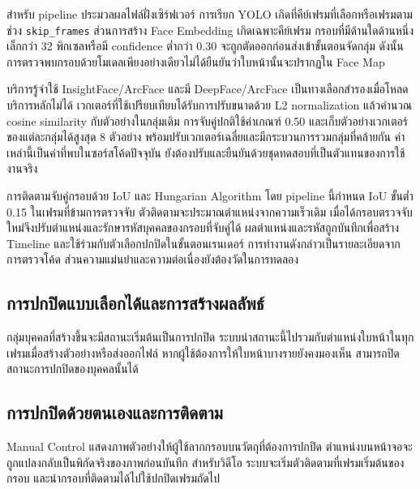 สำหรับ pipeline ประมวลผลไฟล์ฝั่งเซิร์ฟเวอร์ การเรียก YOLO เกิดที่คีย์เฟรมที่เลือกหรือเฟรมตามช่วง \texttt{skip\_frames} ส่วนการสร้าง Face Embedding เกิดเฉพาะคีย์เฟรม กรอบที่มีด้านใดด้านหนึ่งเล็กกว่า 32 พิกเซลหรือมี confidence ต่ำกว่า 0.30 จะถูกตัดออกก่อนส่งเข้าขั้นตอนจัดกลุ่ม ดังนั้นการตรวจพบกรอบด้วยโมเดลเพียงอย่างเดียวไม่ได้ยืนยันว่าใบหน้านั้นจะปรากฏใน Face Map

บริการรู้จำใช้ InsightFace/ArcFace และมี DeepFace/ArcFace เป็นทางเลือกสำรองเมื่อโหลดบริการหลักไม่ได้ เวกเตอร์ที่ใช้เปรียบเทียบได้รับการปรับขนาดด้วย L2 normalization แล้วคำนวณ cosine similarity กับตัวอย่างในกลุ่มเดิม การจับคู่ปกติใช้ค่าเกณฑ์ 0.50 และเก็บตัวอย่างเวกเตอร์ของแต่ละกลุ่มได้สูงสุด 8 ตัวอย่าง พร้อมปรับเวกเตอร์เฉลี่ยและมีกระบวนการรวมกลุ่มที่คล้ายกัน ค่าเหล่านี้เป็นค่าที่พบในซอร์สโค้ดปัจจุบัน ยังต้องปรับและยืนยันด้วยชุดทดสอบที่เป็นตัวแทนของการใช้งานจริง

การติดตามจับคู่กรอบด้วย IoU และ Hungarian Algorithm โดย pipeline นี้กำหนด IoU ขั้นต่ำ 0.15 ในเฟรมที่ข้ามการตรวจจับ ตัวติดตามจะประมาณตำแหน่งจากความเร็วเดิม เมื่อได้กรอบตรวจจับใหม่จึงปรับตำแหน่งและรักษารหัสบุคคลของกรอบที่จับคู่ได้ ผลตำแหน่งและรหัสถูกบันทึกเพื่อสร้าง Timeline และใช้ร่วมกับตัวเลือกปกปิดในขั้นตอนเรนเดอร์ การทำงานดังกล่าวเป็นรายละเอียดจากการตรวจโค้ด ส่วนความแม่นยำและความต่อเนื่องยังต้องวัดในการทดลอง

\subsection{การปกปิดแบบเลือกได้และการสร้างผลลัพธ์}

กลุ่มบุคคลที่สร้างขึ้นจะมีสถานะเริ่มต้นเป็นการปกปิด ระบบนำสถานะนี้ไปรวมกับตำแหน่งใบหน้าในทุกเฟรมเมื่อสร้างตัวอย่างหรือส่งออกไฟล์ หากผู้ใช้ต้องการให้ใบหน้าบางรายยังคงมองเห็น สามารถปิดสถานะการปกปิดของบุคคลนั้นได้

\subsection{การปกปิดด้วยตนเองและการติดตาม}

Manual Control แสดงภาพตัวอย่างให้ผู้ใช้ลากกรอบบนวัตถุที่ต้องการปกปิด ตำแหน่งบนหน้าจอจะถูกแปลงกลับเป็นพิกัดจริงของภาพก่อนบันทึก สำหรับวิดีโอ ระบบจะเริ่มตัวติดตามที่เฟรมเริ่มต้นของกรอบ และนำกรอบที่ติดตามได้ไปใช้ปกปิดเฟรมถัดไป
